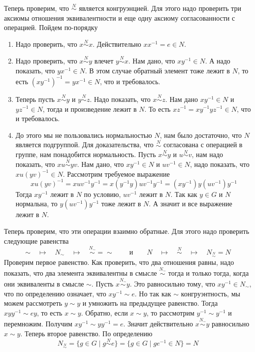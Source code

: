 \gitem Теперь проверим, что $\stackrel{N}{\sim}$ является конгруэнцией.
Для этого надо проверить три аксиомы отношения эквивалентности и еще одну аксиому согласованности с операцией.
Пойдем по-порядку
\begin{enumerate}
\item Надо проверить, что $x \stackrel{N}{\sim}x$.
Действительно $xx^{-1} = e \in N$.

\item Надо проверить, что $x\stackrel{N}{\sim}y$ влечет $y \stackrel{N}{\sim}x$.
Нам дано, что $xy^{-1}\in N$.
А надо показать, что $yx^{-1}\in N$.
В этом случае обратный элемент тоже лежит в $N$, то есть
$(xy^{-1})^{-1} = yx^{-1}\in N$, что и требовалось.

\item Теперь пусть $x\stackrel{N}{\sim}y$ и $y\stackrel{N}{\sim}z$.
Надо показать, что $x\stackrel{N}{\sim}z$.
Нам дано $xy^{-1}\in N$ и $yz^{-1}\in N$, тогда и произведение лежит в $N$.
То есть $xz^{-1} =  xy^{-1} yz^{-1}\in N$, что и требовалось.

\item До этого мы не пользовались нормальностью $N$, нам было достаточно, что $N$ является подгруппой.
Для доказательства, что $\stackrel{N}{\sim}$ согласована с операцией в группе, нам понадобится нормальность.
Пусть $x\stackrel{N}{\sim}y$ и $u\stackrel{N}{\sim}v$, нам надо показать, что $x u \stackrel{N}{\sim} y v$.
Нам дано, что $xy^{-1}\in N$ и $uv^{-1}\in N$, надо показать, что $xu(yv)^{-1}\in N$.
Рассмотрим требуемое выражение
\[
xu(yv)^{-1} = xu v^{-1} y^{-1} = x(y^{-1}y)u v^{-1} y^{-1} = (xy^{-1})y(u v^{-1}) y^{-1}
\]
Тогда $xy^{-1}$ лежит в $N$ по условию, $uv^{-1}$ лежит в $N$.
Так как $y\in G$ и $N$ нормальна, то $y(uv^{-1})y^{-1}$ тоже лежит в $N$.
А значит и все выражение лежит в $N$.
\end{enumerate}

\gitem Теперь проверим, что эти операции взаимно обратные.
Для этого надо проверить следующие равенства
\[
\sim \quad\mapsto\quad N_\sim\quad \mapsto\quad \stackrel{N_\sim}{\sim} = \sim\
\quad\quad
\text{и}
\quad\quad
N \quad\mapsto \quad\stackrel{N}{\sim} \quad\mapsto\quad N_{\stackrel{N}{\sim}} = N
\]
Проверим первое равенство.
Как проверить, что два отношения равны, надо показать, что два элемента эквивалентны в смысле $\stackrel{N_\sim}{\sim}$ тогда и только тогда, когда они эквиваленты в смысле $\sim$.
Пусть $x\stackrel{N_\sim}{\sim} y$.
Это равносильно тому, что $xy^{-1}\in  N_\sim$, что по определению означает, что $xy^{-1}\sim e$.
Но так как $\sim$ конгруэнтность, мы можем рассмотреть $y\sim y$ и умножить на предыдущее равенство.
Тогда $xyy^{-1}\sim e y$, то есть $x\sim y$.
Обратно, если $x\sim y$, то рассмотрим $y^{-1}\sim y^{-1}$ и перемножим.
Получим $xy^{-1}\sim y y^{-1} = e$.
Значит действительно $x\stackrel{N_\sim}{\sim} y$ равносильно $x\sim y$.
Теперь второе равенство.
По определению
\[
N_{\stackrel{N}{\sim}} = \{g\in G \mid g \stackrel{N}{\sim} e\} = \{g\in G \mid g e^{-1}\in N\} = N
\]


